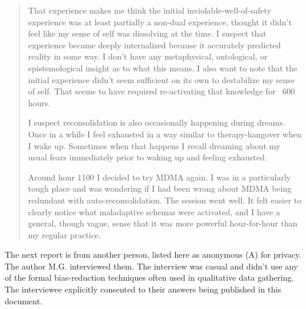 \documentclass[12pt,letterpaper]{book}
\begin{document}
\begin{quotation}
    That experience makes me think the initial inviolable-well-of-safety experience was at least partially a non-dual experience, thought it didn't feel like my sense of self was dissolving at the time. I suspect that experience became deeply internalized because it accurately predicted reality in some way. I don't have any metaphysical, ontological, or epistemological insight as to what this means. I also want to note that the initial experience didn't seem sufficient on its own to destabilize my sense of self. That seems to have required re-activating that knowledge for ~600 hours.

    I suspect reconsolidation is also occasionally happening during dreams. Once in a while I feel exhausted in a way similar to therapy-hangover when I wake up. Sometimes when that happens I recall dreaming about my usual fears immediately prior to waking up and feeling exhausted.

    Around hour 1100 I decided to try MDMA again. I was in a particularly tough place and was wondering if I had been wrong about MDMA being redundant with auto-reconsolidation. The session went well. It felt easier to clearly notice what maladaptive schemas were activated, and I have a general, though vague, sense that it was more powerful hour-for-hour than my regular practice.
\end{quotation}
The next report is from another person, listed here as anonymous (A) for privacy. The author M.G. interviewed them. The interview was casual and didn't use any of the formal bias-reduction techniques often used in qualitative data gathering. The interviewee explicitly consented to their answers being published in this document.
\end{document}
